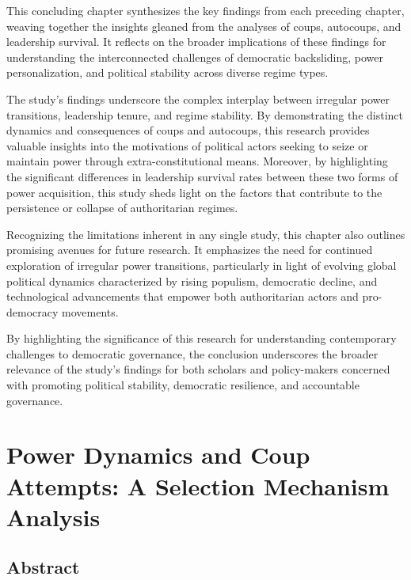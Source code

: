 \documentclass[
  12pt,
]{report}
\begin{document}
This concluding chapter synthesizes the key findings from each preceding
chapter, weaving together the insights gleaned from the analyses of
coups, autocoups, and leadership survival. It reflects on the broader
implications of these findings for understanding the interconnected
challenges of democratic backsliding, power personalization, and
political stability across diverse regime types.

The study's findings underscore the complex interplay between irregular
power transitions, leadership tenure, and regime stability. By
demonstrating the distinct dynamics and consequences of coups and
autocoups, this research provides valuable insights into the motivations
of political actors seeking to seize or maintain power through
extra-constitutional means. Moreover, by highlighting the significant
differences in leadership survival rates between these two forms of
power acquisition, this study sheds light on the factors that contribute
to the persistence or collapse of authoritarian regimes.

Recognizing the limitations inherent in any single study, this chapter
also outlines promising avenues for future research. It emphasizes the
need for continued exploration of irregular power transitions,
particularly in light of evolving global political dynamics
characterized by rising populism, democratic decline, and technological
advancements that empower both authoritarian actors and pro-democracy
movements.

By highlighting the significance of this research for understanding
contemporary challenges to democratic governance, the conclusion
underscores the broader relevance of the study's findings for both
scholars and policy-makers concerned with promoting political stability,
democratic resilience, and accountable governance.

\chapter{Power Dynamics and Coup Attempts: A Selection Mechanism
Analysis}\label{sec-chapter2}

\section*{Abstract}\label{abstract-1}
\end{document}

